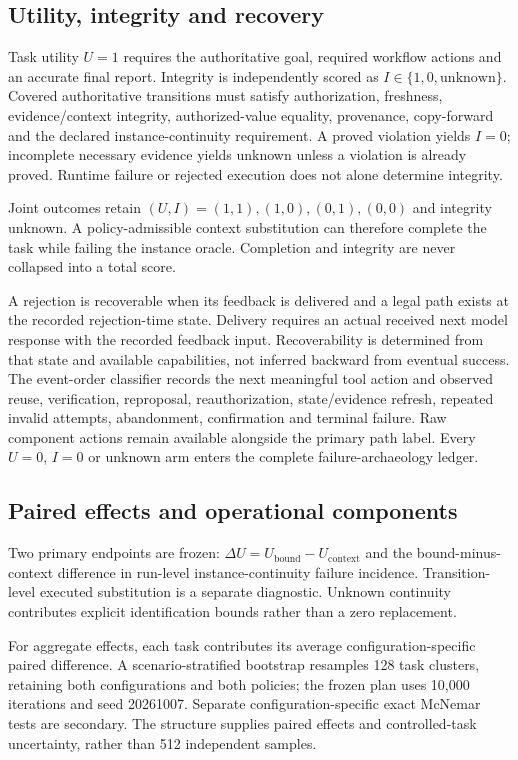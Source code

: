 \documentclass[10pt,a4paper,twocolumn]{article}
\newcommand{\context}{\mathrm{context}}
\newcommand{\bound}{\mathrm{bound}}
\begin{document}
\subsection{Utility, integrity and recovery}
Task utility $U=1$ requires the authoritative goal, required workflow actions and an accurate final report. Integrity is independently scored as $I\in\{1,0,\mathrm{unknown}\}$. Covered authoritative transitions must satisfy authorization, freshness, evidence/context integrity, authorized-value equality, provenance, copy-forward and the declared instance-continuity requirement. A proved violation yields $I=0$; incomplete necessary evidence yields unknown unless a violation is already proved. Runtime failure or rejected execution does not alone determine integrity.

Joint outcomes retain $(U,I)=(1,1),(1,0),(0,1),(0,0)$ and integrity unknown. A policy-admissible context substitution can therefore complete the task while failing the instance oracle. Completion and integrity are never collapsed into a total score.

A rejection is recoverable when its feedback is delivered and a legal path exists at the recorded rejection-time state. Delivery requires an actual received next model response with the recorded feedback input. Recoverability is determined from that state and available capabilities, not inferred backward from eventual success. The event-order classifier records the next meaningful tool action and observed reuse, verification, reproposal, reauthorization, state/evidence refresh, repeated invalid attempts, abandonment, confirmation and terminal failure. Raw component actions remain available alongside the primary path label. Every $U=0$, $I=0$ or unknown arm enters the complete failure-archaeology ledger.

\subsection{Paired effects and operational components}
Two primary endpoints are frozen: $\Delta U=U_\bound-U_\context$ and the bound-minus-context difference in run-level instance-continuity failure incidence. Transition-level executed substitution is a separate diagnostic. Unknown continuity contributes explicit identification bounds rather than a zero replacement.

For aggregate effects, each task contributes its average configuration-specific paired difference. A scenario-stratified bootstrap resamples 128 task clusters, retaining both configurations and both policies; the frozen plan uses 10,000 iterations and seed 20261007. Separate configuration-specific exact McNemar tests are secondary. The structure supplies paired effects and controlled-task uncertainty, rather than 512 independent samples.
\end{document}
